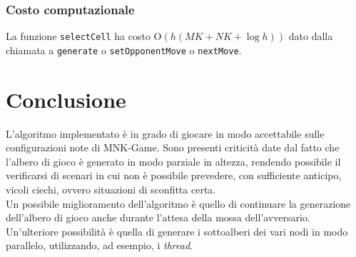 \documentclass[11pt]{article}
\begin{document}
\subsubsection*{Costo computazionale}
La funzione \texttt{selectCell} ha costo O$(h(MK+NK+\log h))$ dato dalla chiamata a \texttt{generate} o \texttt{setOpponentMove} o \texttt{nextMove}.

\section*{Conclusione}
L'algoritmo implementato è in grado di giocare in modo accettabile sulle configurazioni note di MNK-Game. Sono presenti criticità date dal fatto che l'albero di gioco è generato in modo parziale in altezza, rendendo possibile il verificarsi di scenari in cui non è possibile prevedere, con sufficiente anticipo, vicoli ciechi, ovvero situazioni di sconfitta certa.\\
Un possibile miglioramento dell'algoritmo è quello di continuare la generazione dell'albero di gioco anche durante l'attesa della mossa dell'avversario.\\
Un'ulteriore possibilità è quella di generare i sottoalberi dei vari nodi in modo parallelo, utilizzando, ad esempio, i \textit{thread}.
\end{document}
